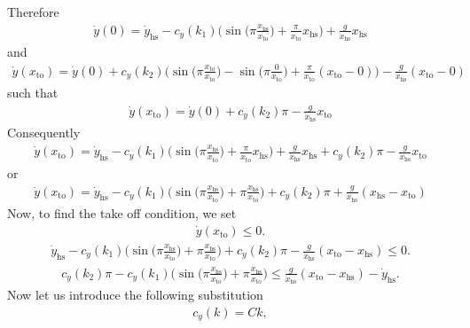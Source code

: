 \documentclass[journal,12pt,onecolumn]{IEEEtran}
\begin{document}
Therefore    
\begin{align}
	\dot{y}(0) =\dot{y}_{\text{hs}} - c_{y}(k_1) \Big( \sin \Big(\pi\frac{x_\text{hs}}{x_\text{to}} \Big) + \frac{\pi}{x_{\text{to}}}x_{\text{hs}} \Big) + \frac{g}{\dot{x}_{\text{hs}}} x_{\text{hs}}
\end{align}
and
\begin{align}
	\dot{y}(x_{\text{to}}) = \dot{y}(0) + c_{y}(k_2) \Big(\sin \Big(\pi\frac{x_{\text{to}}}{x_\text{to}}\Big) - \sin \Big(\pi\frac{0}{x_\text{to}} \Big) + \frac{\pi}{x_{\text{to}}}(x_{\text{to}}-0) \Big) - \frac{g}{\dot{x}_{\text{hs}}}(x_{\text{to}}-0)
\end{align}
such that
\begin{align}
	\dot{y}(x_{\text{to}}) = \dot{y}(0) + c_{y}(k_2) \pi - \frac{g}{\dot{x}_{\text{hs}}}x_{\text{to}}
\end{align}
Consequently
\begin{align}
	\dot{y}(x_{\text{to}}) = \dot{y}_{\text{hs}} - c_{y}(k_1) \Big( \sin \Big(\pi\frac{x_\text{hs}}{x_\text{to}} \Big) + \frac{\pi}{x_{\text{to}}}x_{\text{hs}} \Big) + \frac{g}{\dot{x}_{\text{hs}}} x_{\text{hs}} + c_{y}(k_2) \pi - \frac{g}{\dot{x}_{\text{hs}}}x_{\text{to}}
\end{align}
or
\begin{align}
	\dot{y}(x_{\text{to}}) = \dot{y}_{\text{hs}} - c_{y}(k_1) \Big( \sin \Big(\pi\frac{x_\text{hs}}{x_\text{to}} \Big) + \pi \frac{x_{\text{hs}}}{x_{\text{to}}} \Big) +c_{y}(k_2) \pi + \frac{g}{\dot{x}_{\text{hs}}} (x_{\text{hs}}-x_{\text{to}})
\end{align}
Now, to find the take off condition, we set
\begin{align}
\dot{y}(x_{\text{to}})\leq 0.
\end{align}
\begin{align}
	\dot{y}_{\text{hs}} - c_{y}(k_1) \Big( \sin \Big(\pi\frac{x_\text{hs}}{x_\text{to}} \Big) + \pi \frac{x_{\text{hs}}}{x_{\text{to}}} \Big) +c_{y}(k_2) \pi - \frac{g}{\dot{x}_{\text{hs}}} (x_{\text{to}}-x_{\text{hs}})\leq 0.
\end{align}
\begin{align}
c_{y}(k_2) \pi - c_{y}(k_1) \Big( \sin \Big(\pi\frac{x_\text{hs}}{x_\text{to}} \Big) + \pi \frac{x_{\text{hs}}}{x_{\text{to}}} \Big) \leq \frac{g}{\dot{x}_{\text{hs}}} (x_{\text{to}}-x_{\text{hs}}) - \dot{y}_{\text{hs}}.
\end{align}
Now let us introduce the following substitution
\begin{align}
	c_{y}(k) = C k,
\end{align}
\end{document}
